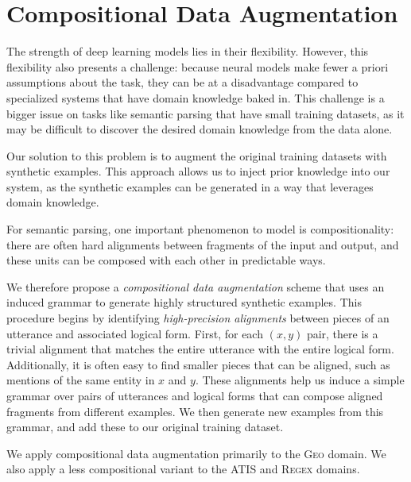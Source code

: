 \documentclass[11pt,letterpaper]{article}
\newcommand{\atis}{\textsc{ATIS}\xspace}
\newcommand{\regex}{\textsc{Regex}\xspace}
\newcommand{\geo}{\textsc{Geo}\xspace}
\newcommand\pl[1]{}
\newcommand\rj[1]{}
\begin{document}
\section{Compositional Data Augmentation}
The strength of deep learning models lies in their flexibility.
However, this flexibility also presents a challenge:
because neural models make fewer a priori assumptions about the task,
they can be at a disadvantage compared to specialized systems
that have domain knowledge baked in.
This challenge is a bigger issue on tasks like semantic parsing
that have small training datasets, as
it may be difficult to discover the desired domain knowledge
from the data alone.

Our solution to this problem is to
augment the original training datasets with synthetic examples.
This approach allows us to inject prior knowledge into our system,
as the synthetic examples can be generated 
in a way that leverages domain knowledge.

For semantic parsing, one important phenomenon to model is compositionality:
there are often hard alignments between fragments
of the input and output, and these units can be composed
with each other in predictable ways.
\pl{need an example / FIGURE illustrating compositionality - this is too abstract }
\rj{I'm hoping that the geo augmentation figure is sufficient?}
We therefore propose a \emph{compositional data augmentation} scheme
that uses an induced grammar to generate highly structured synthetic examples.
This procedure begins by identifying \emph{high-precision alignments}
between pieces of an utterance and associated logical form.
First, for each $(x, y)$ pair, there is a trivial alignment that
matches the entire utterance with the entire logical form.
Additionally, it is often easy to find smaller pieces that can be aligned,
such as mentions of the same entity in $x$ and $y$.
These alignments help us
induce a simple grammar over pairs of utterances and logical forms
that can compose aligned fragments from different examples.
We then generate new examples from this grammar,
and add these to our original training dataset.

We apply compositional data augmentation primarily to the \geo domain.
We also apply a less compositional variant to the
\atis and \regex domains.
\end{document}
